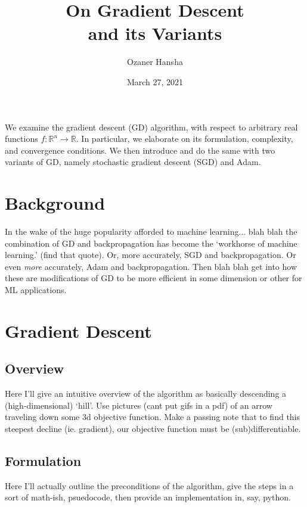 \documentclass{article}
\makeatletter
\newcommand{\R}{\mathbb R}
\let\oldabstract\abstract
\let\oldendabstract\endabstract
\renewenvironment{abstract}
{\renewenvironment{quotation}%
  {\list{}{\addtolength{\leftmargin}{6em} %
      \listparindent 1.5em%
      \itemindent    \listparindent%
      \rightmargin   \leftmargin%
      \parsep        \z@ \@plus\p@}%
    \item\relax}%
  {\endlist}%
\oldabstract}
{\oldendabstract}
\makeatother
\begin{document}
\title{On Gradient Descent\\and its Variants}
\author{Ozaner Hansha}
\date{March 27, 2021}
\maketitle

\begin{abstract}
    We examine the gradient descent (GD) algorithm, with respect to arbitrary real functions $f:\R^n\to\R$. In particular, we elaborate on its formulation, complexity, and convergence conditions. We then introduce and do the same with two variants of GD, namely stochastic gradient descent (SGD) and Adam.
\end{abstract}

\section*{Background}
In the wake of the huge popularity afforded to machine learning... blah blah the combination of GD and backpropagation has become the `workhorse of machine learning.' (find that quote). Or, more accurately, SGD and backpropagation. Or even \textit{more} accurately, Adam and backpropagation. Then blah blah get into how these are modifications of GD to be more efficient in some dimension or other for ML applications.

\section*{Gradient Descent}
\subsection*{Overview}
  Here I'll give an intuitive overview of the algorithm as basically descending a (high-dimensional) `hill'. Use pictures (cant put gifs in a pdf) of an arrow traveling down some 3d objective function. Make a passing note that to find this steepest decline (ie. gradient), our objective function must be (sub)differentiable.

\subsection*{Formulation}
  Here I'll actually outline the preconditions of the algorithm, give the steps in a sort of math-ish, psuedocode, then provide an implementation in, say, python.\cite{2019arXiv190303614Z} \cite{2016arXiv160904747R}
\end{document}
